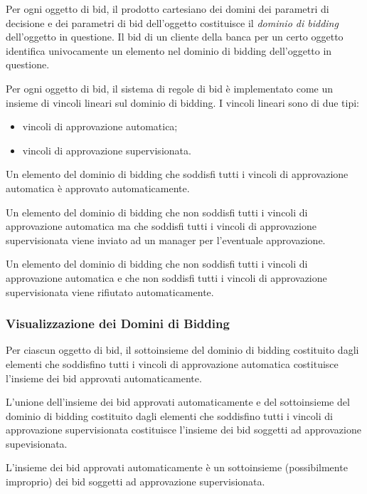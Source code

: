 Per ogni oggetto di bid, il prodotto cartesiano dei domini dei parametri di decisione e dei parametri di bid dell'oggetto costituisce il \emph{dominio di bidding} dell'oggetto in questione.
Il bid di un cliente della banca per un certo oggetto identifica univocamente un elemento nel dominio di bidding dell'oggetto in questione.

Per ogni oggetto di bid, il sistema di regole di bid è implementato come un insieme di vincoli lineari sul dominio di bidding.
I vincoli lineari sono di due tipi:
\begin{itemize}
	\item vincoli di approvazione automatica;

	\item vincoli di approvazione supervisionata.
\end{itemize}

Un elemento del dominio di bidding che soddisfi tutti i vincoli di approvazione automatica è approvato automaticamente.

Un elemento del dominio di bidding che non soddisfi tutti i vincoli di approvazione automatica ma che soddisfi tutti i vincoli di approvazione supervisionata viene inviato ad un manager per l'eventuale approvazione.

Un elemento del dominio di bidding che non soddisfi tutti i vincoli di approvazione automatica e che non soddisfi tutti i vincoli di approvazione supervisionata viene rifiutato automaticamente.

\subsubsection{Visualizzazione dei Domini di Bidding}

Per ciascun oggetto di bid, il sottoinsieme del dominio di bidding costituito dagli elementi che soddisfino tutti i vincoli di approvazione automatica costituisce l'insieme dei bid approvati automaticamente.

L'unione dell'insieme dei bid approvati automaticamente e del sottoinsieme del dominio di bidding costituito dagli elementi che soddisfino tutti i vincoli di approvazione supervisionata costituisce l'insieme dei bid soggetti ad approvazione supevisionata.

L'insieme dei bid approvati automaticamente è un sottoinsieme (possibilmente improprio) dei bid soggetti ad approvazione supervisionata.

